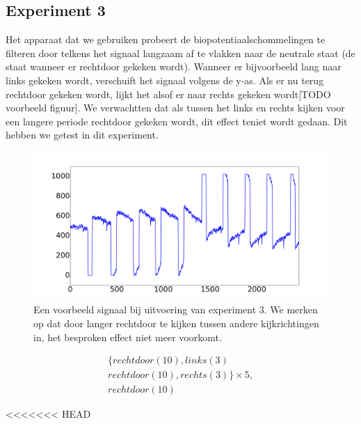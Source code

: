 \documentclass{article}
\begin{document}
\subsection{Experiment 3}

Het apparaat dat we gebruiken probeert de biopotentiaalschommelingen te filteren door telkens het signaal langzaam af te vlakken naar de neutrale staat (de staat wanneer er rechtdoor gekeken wordt). Wanneer er bijvoorbeeld lang naar links gekeken wordt, verschuift het signaal volgens de y-as. Als er nu terug rechtdoor gekeken wordt, lijkt het alsof er naar rechts gekeken wordt[TODO voorbeeld figuur]. We verwachtten dat als tussen het links en rechts kijken voor een langere periode rechtdoor gekeken wordt, dit effect teniet wordt gedaan. Dit hebben we getest in dit experiment.

\begin{figure}[h]
\centering
\includegraphics[width=\linewidth]{images/experiment3}
\caption{Een voorbeeld signaal bij uitvoering van experiment 3. We merken op dat door langer rechtdoor te kijken tussen andere kijkrichtingen in, het besproken effect niet meer voorkomt. }
\label{fig:exp2}
\end{figure}

\begin{equation}
\begin{aligned}
\label{seq:exp3}
& \{rechtdoor(10), links(3) & \\
& rechtdoor(10), rechts(3)\} \times 5,& \\
& rechtdoor(10) &
\end{aligned}
\end{equation}

<<<<<<< HEAD
\end{document}
